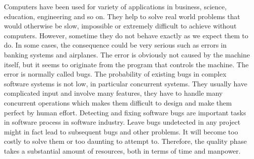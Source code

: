 \label{chapter:verification}

Computers have been used for variety of applications in business, science, education, engineering and so on. They help to solve real world problems that would otherwise be slow, impossible or extremely difficult to achieve without computers. However, sometime they do not behave exactly as we expect them to do. In some cases, the consequence could be very serious such as errors in banking systems and airplanes. The error is obviously not caused by the machine itself, but it seems to originate from the program that controls the machine. The error is normally called bugs. 
%
The probability of existing bugs in complex software systems is not low, in particular concurrent systems. They usually have complicated input and involve many features, they have to handle many concurrent operations which makes them difficult to design and make them perfect by human effort.
%
Detecting and fixing software bugs are important tasks in software process in software industry. Leave bugs
undetected in any project might in fact lead to
subsequent bugs and other problems. It will
become too costly to solve them or too daunting to attempt to. Therefore, the quality phase takes a substantial amount of
resources, both in terms of time and manpower.

